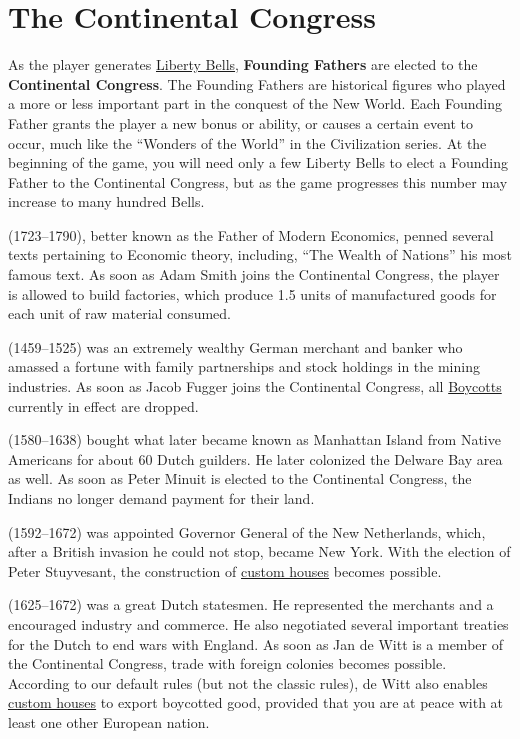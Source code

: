 \documentclass[12pt]{book}
\begin{document}
\hypertarget{Continental Congress}{\chapter{The Continental Congress}}

As the player generates \hyperlink{Liberty Bells}{Liberty Bells},
\hypertarget{Founding Fathers}{\textbf{Founding Fathers}} are elected
to the {\textbf{Continental Congress}}. The Founding Fathers are
historical figures who played a more or less important part in the
conquest of the New World. Each Founding Father grants the player a
new bonus or ability, or causes a certain event to occur, much like
the ``Wonders of the World'' in the Civilization series. At the
beginning of the game, you will need only a few Liberty Bells to elect
a Founding Father to the Continental Congress, but as the game
progresses this number may increase to many hundred Bells.

 (1723--1790), better known as the Father of Modern
Economics, penned several texts pertaining to Economic theory,
including, ``The Wealth of Nations'' his most famous text. As soon as
Adam Smith joins the Continental Congress, the player is allowed to
build factories, which produce 1.5 units of manufactured goods for
each unit of raw material consumed. 

 (1459--1525) was an extremely wealthy German
merchant and banker who amassed a fortune with family partnerships and
stock holdings in the mining industries. As soon as Jacob Fugger joins
the Continental Congress, all \hyperlink{Boycotts}{Boycotts} currently
in effect are dropped. 

 (1580--1638) bought what later became known as
Manhattan Island from Native Americans for about 60 Dutch guilders. He
later colonized the Delware Bay area as well. As soon as Peter Minuit
is elected to the Continental Congress, the Indians no longer demand
payment for their land. 

 (1592--1672) was appointed Governor General
of the New Netherlands, which, after a British invasion he could not
stop, became New York. With the election of Peter Stuyvesant, the
construction of \hyperlink{Custom House}{custom houses} becomes
possible. 

 (1625--1672) was a great Dutch statesmen.  He
represented the merchants and a encouraged industry and commerce. He
also negotiated several important treaties for the Dutch to end wars
with England. As soon as Jan de Witt is a member of the Continental
Congress, trade with foreign colonies becomes possible. According to
our default rules (but not the classic rules), de Witt also enables
\hyperlink{Custom House}{custom houses} to export boycotted good,
provided that you are at peace with at least one other European
nation.
\end{document}
